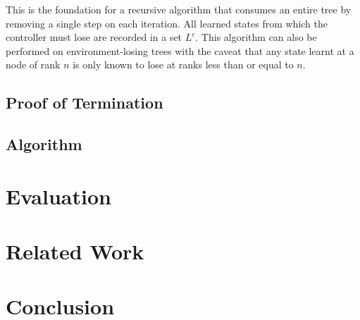 \documentclass{llncs}
\begin{document}
This is the foundation for a recursive algorithm that consumes an entire tree
by removing a single step on each iteration. All learned states from which the
controller must lose are recorded in a set $L^c$.  This algorithm can also be
performed on environment-losing trees with the caveat that any state learnt at
a node of rank $n$ is only known to lose at ranks less than or equal to $n$. 

\subsection{Proof of Termination}

\subsection{Algorithm}

\section{Evaluation}

\section{Related Work}

\section{Conclusion}




\end{document}
